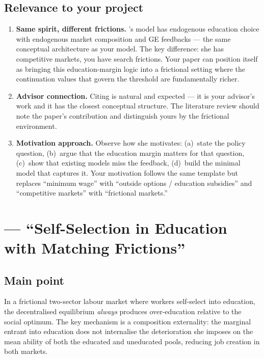 \documentclass[12pt]{article}
\begin{document}
\subsection*{Relevance to your project}

\begin{enumerate}
    \item \textbf{Same spirit, different frictions.} \citet{barany2016}'s model has endogenous education choice with endogenous market composition and GE feedbacks --- the same conceptual architecture as your model. The key difference: she has competitive markets, you have search frictions. Your paper can position itself as bringing this education-margin logic into a frictional setting where the continuation values that govern the threshold are fundamentally richer.

    \item \textbf{Advisor connection.} Citing \citet{barany2016} is natural and expected --- it is your advisor's work and it has the closest conceptual structure. The literature review should note the paper's contribution and distinguish yours by the frictional environment.

    \item \textbf{Motivation approach.} Observe how she motivates: (a)~state the policy question, (b)~argue that the education margin matters for that question, (c)~show that existing models miss the feedback, (d)~build the minimal model that captures it. Your motivation follows the same template but replaces ``minimum wage'' with ``outside options / education subsidies'' and ``competitive markets'' with ``frictional markets.''
\end{enumerate}


\newpage
\section{\citet{charlot2005} --- ``Self-Selection in Education with Matching Frictions''}

\subsection*{Main point}

In a frictional two-sector labour market where workers self-select into education, the decentralised equilibrium \emph{always} produces over-education relative to the social optimum. The key mechanism is a composition externality: the marginal entrant into education does not internalise the deterioration she imposes on the mean ability of both the educated and uneducated pools, reducing job creation in both markets.
\end{document}

